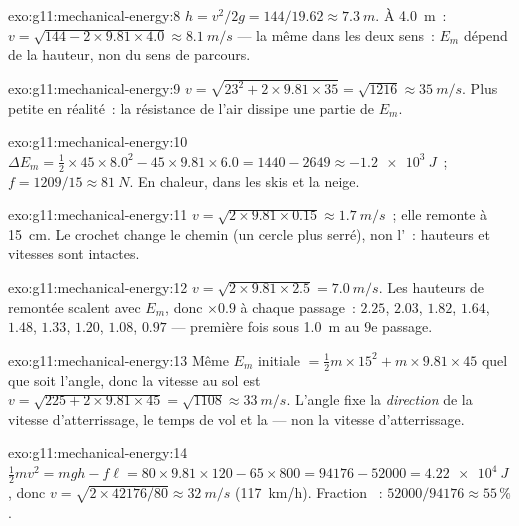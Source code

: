 \begin{solution}{exo:g11:mechanical-energy:8}
$h = v^2/2g = 144/19.62 \approx \qty{7.3}{m}$. À \qty{4.0}{m}~:
$v = \sqrt{144 - 2 \times 9.81 \times 4.0} \approx \qty{8.1}{m/s}$ ---
la même dans les deux sens~: $E_m$ dépend de la hauteur, non du sens
de parcours.
\end{solution}

\begin{solution}{exo:g11:mechanical-energy:9}
$v = \sqrt{23^2 + 2 \times 9.81 \times 35} = \sqrt{1216} \approx
\qty{35}{m/s}$. Plus petite en réalité~: la résistance de l'air dissipe
une partie de $E_m$.
\end{solution}

\begin{solution}{exo:g11:mechanical-energy:10}
$\Delta E_m = \tfrac12 \times 45 \times 8.0^2 - 45 \times 9.81 \times
6.0 = 1440 - 2649 \approx \qty{-1.2e3}{J}$~;
$f = 1209/15 \approx \qty{81}{N}$. En chaleur, dans les skis et la
neige.
\end{solution}

\begin{solution}{exo:g11:mechanical-energy:11}
$v = \sqrt{2 \times 9.81 \times 0.15} \approx \qty{1.7}{m/s}$~; elle
remonte à \qty{15}{cm}. Le crochet change le chemin (un cercle plus
serré), non l'~: hauteurs et
vitesses sont intactes.
\end{solution}

\begin{solution}{exo:g11:mechanical-energy:12}
$v = \sqrt{2 \times 9.81 \times 2.5} = \qty{7.0}{m/s}$. Les hauteurs de
remontée scalent avec $E_m$, donc $\times 0.9$ à chaque passage~:
$2.25$, $2.03$, $1.82$, $1.64$, $1.48$, $1.33$, $1.20$, $1.08$,
$0.97$ --- première fois sous \qty{1.0}{m} au $9$e passage.
\end{solution}

\begin{solution}{exo:g11:mechanical-energy:13}
Même $E_m$ initiale $= \tfrac12 m \times 15^2 + m \times 9.81 \times 45$
quel que soit l'angle, donc la vitesse au sol est
$v = \sqrt{225 + 2 \times 9.81 \times 45} = \sqrt{1108} \approx
\qty{33}{m/s}$. L'angle fixe la \emph{direction} de la vitesse
d'atterrissage, le temps de vol et la
 --- non la vitesse
d'atterrissage.
\end{solution}

\begin{solution}{exo:g11:mechanical-energy:14}
$\tfrac12 mv^2 = mgh - f\ell = 80 \times 9.81 \times 120 - 65 \times
800 = \num{94176} - \num{52000} = \qty{4.22e4}{J}$, donc
$v = \sqrt{2 \times \num{42176}/80} \approx \qty{32}{m/s}$
(\qty{117}{km/h}). Fraction
~: $52000/94176 \approx 55\,\%$.
\end{solution}

